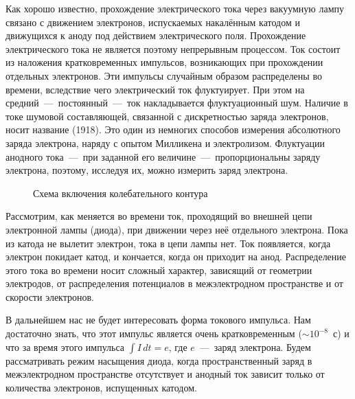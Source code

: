 


Как хорошо известно, прохождение электрического тока через вакуумную лампу связано с движением электронов, испускаемых
накалённым катодом и движущихся к аноду под действием электрического поля. Прохождение электрического тока не является
поэтому непрерывным процессом. Ток состоит из наложения кратковременных импульсов, возникающих при прохождении отдельных
электронов. Эти импульсы случайным образом распределены во времени, вследствие чего электрический ток флуктуирует. При
этом на средний~---~постоянный~---~ток накладывается флуктуационный шум. Наличие в токе шумовой составляющей, связанной
с дискретностью заряда электронов, носит название  (1918). Это один из немногих способов измерения
абсолютного заряда электрона, наряду с опытом Милликена и электролизом. Флуктуации анодного тока~---~при заданной его
величине~---~пропорциональны заряду электрона, поэтому, исследуя их, можно измерить заряд электрона.

\begin{figure}[h!]
	\caption{Схема включения колебательного контура}
\end{figure}

Рассмотрим, как меняется во времени ток, проходящий во внешней цепи электронной лампы (диода), при движении через неё
отдельного электрона. Пока из катода не вылетит электрон, тока в цепи лампы нет. Ток появляется, когда электрон покидает
катод, и кончается, когда он приходит на анод. Распределение этого тока во времени носит сложный характер, зависящий от
геометрии электродов, от распределения потенциалов в межэлектродном пространстве и от скорости электронов.

В дальнейшем нас не будет интересовать форма токового импульса. Нам достаточно знать, что этот импульс является очень
кратковременным (${\sim}10^{-8}$~с) и что за время этого импульса $\int I\,dt=e$, где $e$~---~заряд электрона. Будем
рассматривать режим насыщения диода, когда пространственный заряд в межэлектродном пространстве отсутствует и анодный
ток зависит только от количества электронов, испущенных катодом.

